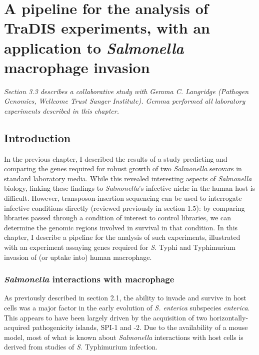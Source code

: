 
\chapter{A pipeline for the analysis of TraDIS experiments, with an application to {\it Salmonella} macrophage invasion}
\label{sec:chapterPingpong}
\ifpdf
    \graphicspath{{Chapter3/Chapter3Figs/EPS/}{Chapter3/Chapter3Figs/}}
\fi

\textit{Section 3.3 describes a collaborative study with Gemma C. Langridge (Pathogen Genomics, Wellcome Trust Sanger Institute). Gemma performed all laboratory experiments described in this chapter.}

\section{Introduction}

In the previous chapter, I described the results of a study predicting and comparing the genes required for robust growth of two \textit{Salmonella} serovars in standard laboratory media. While this revealed interesting aspects of \textit{Salmonella} biology, linking these findings to \textit{Salmonella}'s infective niche in the human host is difficult. However, transposon-insertion sequencing can be used to interrogate infective conditions directly (reviewed previously in section 1.5): by comparing libraries passed through a condition of interest to control libraries, we can determine the genomic regions involved in survival in that condition. In this chapter, I describe a pipeline for the analysis of such experiments, illustrated with an experiment assaying genes required for \textit{S.} Typhi and Typhimurium invasion of (or uptake into) human macrophage.

\subsection{\textit{Salmonella} interactions with macrophage}

As previously described in section 2.1, the ability to invade and survive in host cells was a major factor in the early evolution of \textit{S. enterica} subspecies \textit{enterica}. This appears to have been largely driven by the acquisition of two horizontally-acquired pathogenicity islands, SPI-1 and -2. Due to the availability of a mouse model\parencite{Santos2001}, most of what is known about \textit{Salmonella} interactions with host cells is derived from studies of \textit{S.} Typhimurium infection. 

